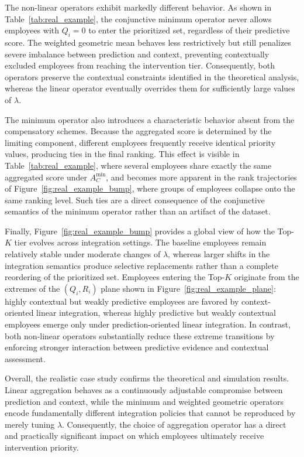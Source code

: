 \documentclass[mathematics,article,submit,moreauthors]{Definitions/mdpi}
\begin{document}
{The non-linear operators exhibit markedly different behavior. As shown in Table~\ref{tab:real_example}, the conjunctive minimum operator never allows employees with $Q_i=0$ to enter the prioritized set, regardless of their predictive score. The weighted geometric mean behaves less restrictively but still penalizes severe imbalance between prediction and context, preventing contextually excluded employees from reaching the intervention tier. Consequently, both operators preserve the contextual constraints identified in the theoretical analysis, whereas the linear operator eventually overrides them for sufficiently large values of $\lambda$.

The minimum operator also introduces a characteristic behavior absent from the compensatory schemes. Because the aggregated score is determined by the limiting component, different employees frequently receive identical priority values, producing ties in the final ranking. This effect is visible in Table~\ref{tab:real_example}, where several employees share exactly the same aggregated score under $A_C^{\min}$, and becomes more apparent in the rank trajectories of Figure~\ref{fig:real_example_bump}, where groups of employees collapse onto the same ranking level. Such ties are a direct consequence of the conjunctive semantics of the minimum operator rather than an artifact of the dataset.

Finally, Figure~\ref{fig:real_example_bump} provides a global view of how the Top-$K$ tier evolves across integration settings. The baseline employees remain relatively stable under moderate changes of $\lambda$, whereas larger shifts in the integration semantics produce selective replacements rather than a complete reordering of the prioritized set. Employees entering the Top-$K$ originate from the extremes of the $(Q_i,R_i)$ plane shown in Figure~\ref{fig:real_example_plane}: highly contextual but weakly predictive employees are favored by context-oriented linear integration, whereas highly predictive but weakly contextual employees emerge only under prediction-oriented linear integration. In contrast, both non-linear operators substantially reduce these extreme transitions by enforcing stronger interaction between predictive evidence and contextual assessment.

Overall, the realistic case study confirms the theoretical and simulation results. Linear aggregation behaves as a continuously adjustable compromise between prediction and context, while the minimum and weighted geometric operators encode fundamentally different integration policies that cannot be reproduced by merely tuning $\lambda$. Consequently, the choice of aggregation operator has a direct and practically significant impact on which employees ultimately receive intervention priority.
}
\end{document}
